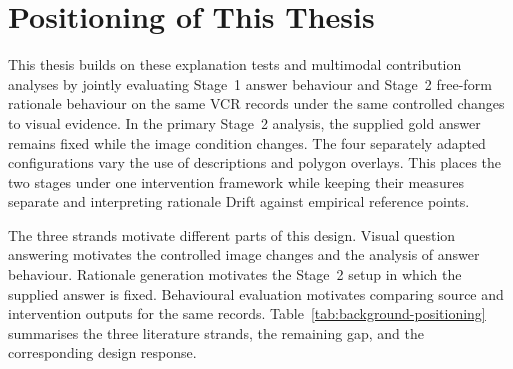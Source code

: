 \enlargethispage{\baselineskip}

\section{Positioning of This Thesis}
\label{sec:background-position}

This thesis builds on these explanation tests and multimodal contribution
analyses by jointly evaluating Stage~1 answer behaviour and Stage~2 free-form rationale
behaviour on the same VCR records under the same controlled changes to visual
evidence. In the primary Stage~2 analysis, the supplied gold answer remains
fixed while the image condition changes. The four separately adapted
configurations vary the use of descriptions and polygon overlays. This places
the two stages under one intervention framework while keeping their measures
separate and interpreting rationale Drift against empirical reference points.

The three strands motivate different parts of this design. Visual question
answering motivates the controlled image changes and the analysis of answer
behaviour. Rationale generation motivates the Stage~2 setup in which the
supplied answer is fixed. Behavioural evaluation motivates comparing source and
intervention outputs for the same records.
Table~\ref{tab:background-positioning} summarises the three literature strands,
the remaining gap, and the corresponding design response.

